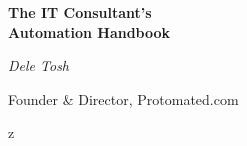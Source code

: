 \documentclass[11pt,letterpaper,openany]{book}
\begin{document}
    \frontmatter

    \begin{titlepage}
        \centering
        \vspace*{2cm}
        {\Huge\bfseries\color{primarydark} The IT Consultant's\\ Automation Handbook\par}
        \vspace{2cm}
        {\Large\itshape Dele Tosh\par}
        \vspace{1cm}
        {\large Founder \& Director, Protomated.com\par}
        \vfill
        {\large \currentmonthyear\par}
    \end{titlepage}

    \tableofcontents

    \mainmatter

    
%    
    
    
    
    

    \backmatter
z
    
    


\end{document}
